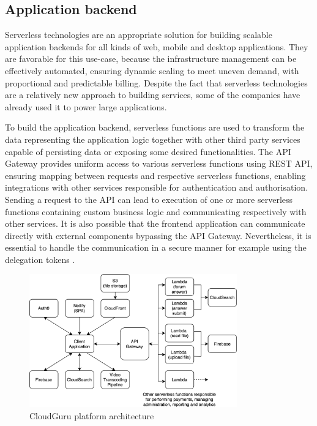 \subsection{Application backend} \label{chapter:serverless-example-application-backend}


Serverless technologies are an appropriate solution for building scalable application backends for all kinds of web, mobile and desktop applications. They are favorable for this use-case, because the infrastructure management can be effectively automated, ensuring dynamic scaling to meet uneven demand, with proportional and predictable billing. Despite the fact that serverless technologies are a relatively new approach to building services, some of the companies have already used it to power large applications.

To build the application backend, serverless functions are used to transform the data representing the application logic together with other third party services capable of persisting data or exposing some desired functionalities. The API Gateway provides uniform access to various serverless functions using REST API, ensuring mapping between requests and respective serverless functions, enabling integrations with other services responsible for authentication and authorisation. Sending a request to the API can lead to execution of one or more serverless functions containing custom business logic and communicating respectively with other services. It is also possible that the frontend application can communicate directly with external components bypassing the API Gateway. Nevertheless, it is essential to handle the communication in a secure manner for example using the delegation tokens \cite{ServerlessArchitectureOnAWS}.

\begin{figure}[h]
    \centering
    \includegraphics[width=0.8\textwidth]{assets/02-serverless/CloudGuruArchitecture.png}
    \caption{CloudGuru platform architecture}
    \label{fig:cloudguru-architecture-diagram}
\end{figure}

